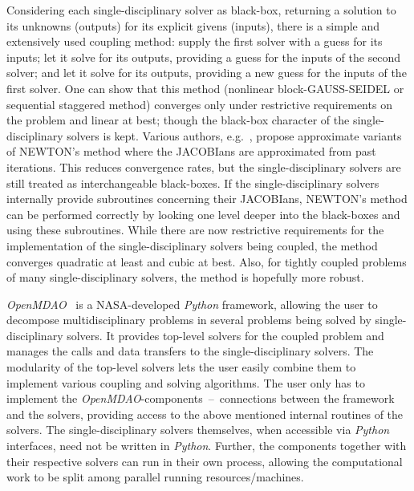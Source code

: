 \documentclass[10pt, ngerman, english,
twoside, open=right,
numbers=noenddot,
declaration=section,
abstract=section,
abstract=multiple,
abstract=notoc,
declaration=notoc,
cd=pale, 
chapterprefix=off, 
chapterpage=false, 
headingsvskip=-10em,
cdgeometry=custom, 
slantedgreek=on,
cdmath=on, 
cdfont=on,
ttfont=false,
mathswap=off,
]{tudscrreprt}
\numberwithin{equation}{chapter}
\renewcommand{\textsc}[1]{\uppercase{\mbox{#1}}}
\newcommand{\sidenote}[1]{
  \leavevmode %
  \marginpar{\hyphenpenalty=1000 \flushleft{\textcolor{HKS41}{#1}}}}
\begin{document}
\sidenote{Coupling}Considering each single-disciplinary solver as black-box, returning a solution to its unknowns (outputs) for its explicit givens (inputs), there is a simple and extensively used coupling method: supply the first solver with a guess for its inputs; let it solve for its outputs, providing a guess for the inputs of the second solver; and let it solve for its outputs, providing a new guess for the inputs of the first solver. One can show that this method (nonlinear block-\textsc{Gau\ss}-\textsc{Seidel} or sequential staggered method) converges only under restrictive requirements on the problem and linear at best; though the black-box character of the single-disciplinary solvers is kept.
Various authors, e.g.~\cite{VierendeelsQNLS, BogaersMVQN}, propose approximate variants of \textsc{Newton}'s method where the \textsc{Jacobi}ans are approximated from past iterations. This reduces convergence rates, but the single-disciplinary solvers are still treated as interchangeable black-boxes. If the single-disciplinary solvers internally provide subroutines concerning their \textsc{Jacobi}ans, \textsc{Newton}'s method can be performed correctly by looking one level deeper into the black-boxes and using these subroutines. While there are now restrictive requirements for the implementation of the single-disciplinary solvers being coupled, the method converges quadratic at least and cubic at best. Also, for tightly coupled problems of many single-disciplinary solvers, the method is hopefully more robust.\par
\sidenote{\textit{OpenMDAO}}\textit{OpenMDAO}~\cite{OpenMDAO, OpenMDAODoc} is a NASA-developed \textit{Python} framework, allowing the user to decompose multidisciplinary problems in several problems being solved by single-disciplinary solvers. It provides top-level solvers for the coupled problem and manages the calls and data transfers to the single-disciplinary solvers. The modularity of the top-level solvers lets the user easily combine them to implement various coupling and solving algorithms. The user only has to implement the \textit{OpenMDAO}-components~--~connections between the framework and the solvers, providing access to the above mentioned internal routines of the solvers. 
The single-disciplinary solvers themselves, when accessible via \textit{Python} interfaces, need not be written in \textit{Python}. Further, the components together with their respective solvers can run in their own process, allowing the computational work to be split among parallel running resources/machines.
\end{document}
